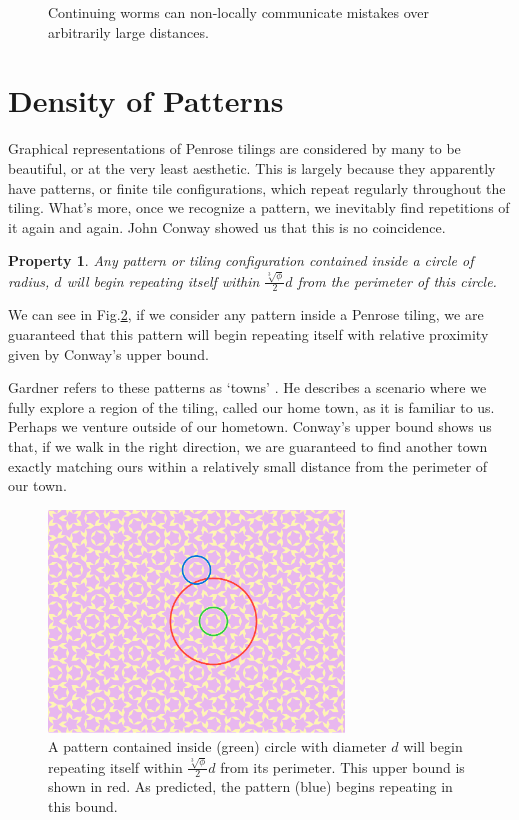 \documentclass[
  oneside,
  11pt, a4paper,
  footinclude=true,
  headinclude=true,
  cleardoublepage=empty
]{scrbook}
\newtheorem{myprop}{Property}
\begin{document}
\begin{figure}[H]
\caption{Continuing worms can non-locally communicate mistakes over arbitrarily large distances.}
\label{fig:wormmistakes}
\end{figure}

\section{Density of Patterns}
Graphical representations of Penrose tilings are considered by many to be beautiful, or at the very least aesthetic. This is largely because they apparently have patterns, or finite tile configurations, which repeat regularly throughout the tiling. What's more, once we recognize a pattern, we inevitably find repetitions of it again and again. John Conway showed us that this is no coincidence.

\begin{myprop}
Any pattern or tiling configuration contained inside a circle of radius, $d$ will begin repeating itself within $\frac{\sqrt[3]{\phi}}{2}d$ from the perimeter of this circle. \cite{Gardner1997}
\end{myprop}

We can see in Fig.\ref{fig:patternfind}, if we consider any pattern inside a Penrose tiling, we are guaranteed that this pattern will begin repeating itself with relative proximity given by Conway's upper bound. 

Gardner refers to these patterns as `towns' \cite{Gardner1997}. He describes a scenario where we fully explore a region of the tiling, called our home town, as it is familiar to us. Perhaps we venture outside of our hometown. Conway's upper bound shows us that, if we walk in the right direction, we are guaranteed to find another town exactly matching ours within a relatively small distance from the perimeter of our town.

\begin{figure}
\centering
\includegraphics[width=0.7\textwidth]{PatternFind3}
\caption{A pattern contained inside (green) circle with diameter $d$ will begin repeating itself within $\frac{\sqrt[3]{\phi}}{2}d$ from its perimeter. This upper bound is shown in red. As predicted, the pattern (blue) begins repeating in this bound.}
\label{fig:patternfind}
\end{figure}
\end{document}
